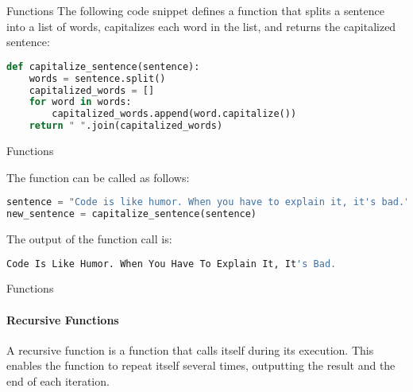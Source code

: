 \documentclass[
    aspectratio=169, 
    usepdftitle=false, 
    xcolor={dvipsnames},
    hyperref={
        colorlinks,
        linkcolor=black,
        urlcolor=blue}
    ]{beamer}
\begin{document}
\begin{frame}[fragile]{Functions}
    The following code snippet defines a function that splits a sentence into a list of words, capitalizes each word in the list, and returns the capitalized sentence:

    \begin{lstlisting}[language=Python]
def capitalize_sentence(sentence):
    words = sentence.split()
    capitalized_words = []
    for word in words:
        capitalized_words.append(word.capitalize())
    return " ".join(capitalized_words)
    \end{lstlisting}

\end{frame}
\begin{frame}[fragile]{Functions}

    The function can be called as follows:

    \begin{lstlisting}[language=Python]
sentence = "Code is like humor. When you have to explain it, it's bad."
new_sentence = capitalize_sentence(sentence)
    \end{lstlisting}

    The output of the function call is:

    \begin{lstlisting}[language=Python]
Code Is Like Humor. When You Have To Explain It, It's Bad.
    \end{lstlisting}
\end{frame}

\begin{frame}[fragile]{Functions}
    \framesubtitle{Recursive Functions}
    A recursive function is a function that calls itself during its execution. This enables the function to repeat itself several times, outputting the result and the end of each iteration.\\~\

\end{frame}
\end{document}
